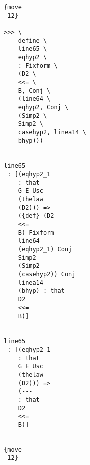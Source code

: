 \documentclass[12pt]{article}
\begin{document}
\begin{verbatim}
                                       {move 
                                        12}

                                       >>> \
                                           define \
                                           line65 \
                                           eqhyp2 \
                                           : Fixform \
                                           (D2 \
                                           <<= \
                                           B, Conj \
                                           (line64 \
                                           eqhyp2, Conj \
                                           (Simp2 \
                                           Simp2 \
                                           casehyp2, linea14 \
                                           bhyp)))


                                       line65 
                                        : [(eqhyp2_1 
                                           : that 
                                           G E Usc 
                                           (thelaw 
                                           (D2))) => 
                                           ({def} (D2 
                                           <<= 
                                           B) Fixform 
                                           line64 
                                           (eqhyp2_1) Conj 
                                           Simp2 
                                           (Simp2 
                                           (casehyp2)) Conj 
                                           linea14 
                                           (bhyp) : that 
                                           D2 
                                           <<= 
                                           B)]


                                       line65 
                                        : [(eqhyp2_1 
                                           : that 
                                           G E Usc 
                                           (thelaw 
                                           (D2))) => 
                                           (--- 
                                           : that 
                                           D2 
                                           <<= 
                                           B)]


                                       {move 
                                        12}


\end{verbatim}
\end{document}
